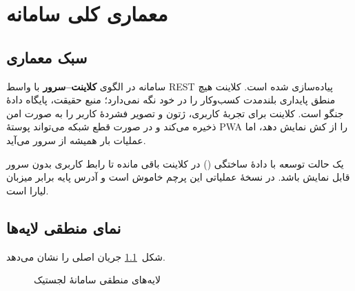 \chapter[معماری سامانه]{معماری کلی سامانه}

\section{سبک معماری}

سامانه در الگوی \textbf{کلاینت--سرور} با واسط \textenglish{REST} پیاده‌سازی شده است. کلاینت هیچ منطق پایداری بلندمدت کسب‌وکار را در خود نگه نمی‌دارد؛ منبع حقیقت، پایگاه دادهٔ جنگو است. کلاینت برای تجربهٔ کاربری، ژتون و تصویر فشردهٔ کاربر را به صورت امن ذخیره می‌کند و در صورت قطع شبکه می‌تواند پوستهٔ \textenglish{PWA} را از کش نمایش دهد، اما عملیات بار همیشه از سرور می‌آید.

یک حالت توسعه با دادهٔ ساختگی () در کلاینت باقی مانده تا رابط کاربری بدون سرور قابل نمایش باشد. در نسخهٔ عملیاتی این پرچم خاموش است و آدرس پایه برابر میزبان لیارا است.

\section{نمای منطقی لایه‌ها}

شکل~\ref{fig:arch} جریان اصلی را نشان می‌دهد.

\begin{figure}[ht]
\centering
{}
\caption{لایه‌های منطقی سامانهٔ لجستیک}
\label{fig:arch}
\end{figure}

